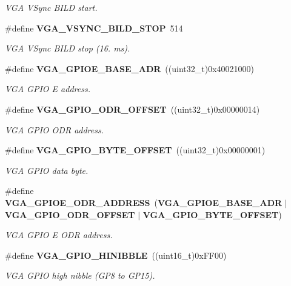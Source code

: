 \begin{DoxyCompactItemize}
\begin{DoxyCompactList}\small\item\em V\+GA V\+Sync B\+I\+LD start. \end{DoxyCompactList}\item 
\#define {\bf V\+G\+A\+\_\+\+V\+S\+Y\+N\+C\+\_\+\+B\+I\+L\+D\+\_\+\+S\+T\+OP}~514\label{system_8h_abf14fb3313d4de9367100e2dcddcd39f}

\begin{DoxyCompactList}\small\item\em V\+GA V\+Sync B\+I\+LD stop (16. ms). \end{DoxyCompactList}\item 
\#define {\bf V\+G\+A\+\_\+\+G\+P\+I\+O\+E\+\_\+\+B\+A\+S\+E\+\_\+\+A\+DR}~((uint32\+\_\+t)0x40021000)\label{system_8h_a758dadcf25d5a3b26f4791e9a332f1bb}

\begin{DoxyCompactList}\small\item\em V\+GA G\+P\+IO E address. \end{DoxyCompactList}\item 
\#define {\bf V\+G\+A\+\_\+\+G\+P\+I\+O\+\_\+\+O\+D\+R\+\_\+\+O\+F\+F\+S\+ET}~((uint32\+\_\+t)0x00000014)\label{system_8h_af70daf7e1e57589c259536efc1187d6c}

\begin{DoxyCompactList}\small\item\em V\+GA G\+P\+IO O\+DR address. \end{DoxyCompactList}\item 
\#define {\bf V\+G\+A\+\_\+\+G\+P\+I\+O\+\_\+\+B\+Y\+T\+E\+\_\+\+O\+F\+F\+S\+ET}~((uint32\+\_\+t)0x00000001)\label{system_8h_ac3336e31bfbbd8199e506f39164a19eb}

\begin{DoxyCompactList}\small\item\em V\+GA G\+P\+IO data byte. \end{DoxyCompactList}\item 
\#define {\bf V\+G\+A\+\_\+\+G\+P\+I\+O\+E\+\_\+\+O\+D\+R\+\_\+\+A\+D\+D\+R\+E\+SS}~({\bf V\+G\+A\+\_\+\+G\+P\+I\+O\+E\+\_\+\+B\+A\+S\+E\+\_\+\+A\+DR} $\vert$ {\bf V\+G\+A\+\_\+\+G\+P\+I\+O\+\_\+\+O\+D\+R\+\_\+\+O\+F\+F\+S\+ET} $\vert$ {\bf V\+G\+A\+\_\+\+G\+P\+I\+O\+\_\+\+B\+Y\+T\+E\+\_\+\+O\+F\+F\+S\+ET})\label{system_8h_a2fb72da69dd330b1ebbff2b8550d1db2}

\begin{DoxyCompactList}\small\item\em V\+GA G\+P\+IO E O\+DR address. \end{DoxyCompactList}\item 
\#define {\bf V\+G\+A\+\_\+\+G\+P\+I\+O\+\_\+\+H\+I\+N\+I\+B\+B\+LE}~((uint16\+\_\+t)0x\+F\+F00)\label{system_8h_a114dc879235023dc8e6f360a6f487a6b}

\begin{DoxyCompactList}\small\item\em V\+GA G\+P\+IO high nibble (G\+P8 to G\+P15). \end{DoxyCompactList}\end{DoxyCompactItemize}
